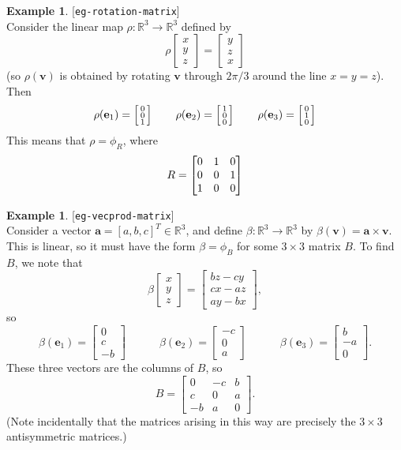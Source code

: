 \documentclass{amsart}
\newcommand{\lbl}[1]{\label{#1}\textup{[\texttt{#1}]}\ \\}
\newcommand{\lbl}{\label}
\newcommand{\R}         {{\mathbb{R}}}
\newcommand{\bbm}       {\left[\begin{matrix}}
\newcommand{\ebm}       {\end{matrix}\right]}
\newcommand{\bsm}       {\left[\begin{smallmatrix}}
\newcommand{\esm}       {\end{smallmatrix}\right]}
\newcommand{\bt}        {\beta}
\newcommand{\tm}        {\times}
\newcommand{\xra}       {\xrightarrow}
\newcommand{\va}        {\mathbf{a}}
\newcommand{\ve}        {\mathbf{e}}
\newcommand{\vv}        {\mathbf{v}}
\renewcommand{\:}       {\colon}
\theoremstyle{definition}
\newtheorem{example}[theorem]{Example}
\begin{document}
\begin{example}\lbl{eg-rotation-matrix}
 {Consider the linear map $\rho\:\R^3\to\R^3$ defined by
 \[ \rho\bsm x \\ y \\ z \esm = \bsm y \\ z \\ x \esm \]}
 {(so $\rho(\vv)$ is obtained by rotating $\vv$ through
 $2\pi/3$ around the line $x=y=z$).}{  Then 
 \[ \rho(\ve_1) = \bsm \RED{0}\\\RED{0}\\\RED{1} \esm \hspace{2em}
    \rho(\ve_2) = \bsm \OLIVEGREEN{1}\\\OLIVEGREEN{0}\\\OLIVEGREEN{0} \esm \hspace{2em}
    \rho(\ve_3) = \bsm \BLUE{0}\\\BLUE{1}\\\BLUE{0} \esm 
 \]}
 {This means that $\rho=\phi_R$, where 
 \[ R = \bbm \RED{0} & \OLIVEGREEN{1} & \BLUE{0} \\
             \RED{0} & \OLIVEGREEN{0} & \BLUE{1} \\
             \RED{1} & \OLIVEGREEN{0} & \BLUE{0} \ebm
 \] } 
\end{example}

\begin{example}\lbl{eg-vecprod-matrix}
 Consider a vector $\va=[a,b,c]^T\in\R^3$, and define
 $\bt\:\R^3\xra{}\R^3$ by $\bt(\vv)=\va\tm\vv$.  This is
 linear, so it must have the form $\bt=\phi_B$ for some
 $3\tm 3$ matrix $B$.  To find $B$, we note that
 \[ \bt\bsm x\\ y\\ z\esm = 
    \bsm bz-cy \\ cx-az \\ ay-bx \esm,
 \]
 so
 \[ \bt(\ve_1) = \bsm 0\\ c \\ -b\esm \hspace{3em}
    \bt(\ve_2) = \bsm -c\\ 0 \\ a\esm \hspace{3em}
    \bt(\ve_3) = \bsm b\\ -a \\ 0\esm.
 \]
 These three vectors are the columns of $B$, so
 \[ B = \bsm 0 & -c & b \\ c & 0 & a \\ -b & a & 0 \esm. \]
 (Note incidentally that the matrices arising in this way are
 precisely the $3\tm 3$ antisymmetric matrices.)
\end{example}
\end{document}
